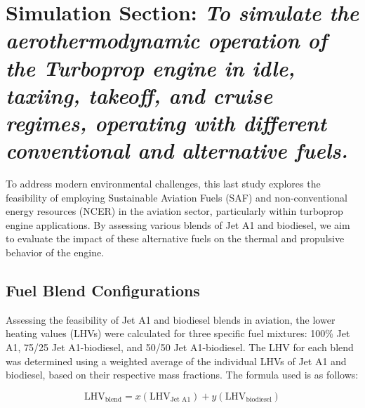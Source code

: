 \documentclass{Format}
\begin{document}


\section{Simulation Section: \emph{To simulate the aerothermodynamic operation of the Turboprop engine in idle, taxiing, takeoff, and cruise regimes, operating with different conventional and alternative fuels.}}\label{sec:Method}

To address modern environmental challenges, this last study explores the feasibility of employing Sustainable Aviation Fuels (SAF) and non-conventional energy resources (NCER) in the aviation sector, particularly within turboprop engine applications. By assessing various blends of Jet A1 and biodiesel, we aim to evaluate the impact of these alternative fuels on the thermal and propulsive behavior of the engine.

\subsection{Fuel Blend Configurations}
Assessing the feasibility of Jet A1 and biodiesel blends in aviation, the lower heating values (LHVs) were calculated for three specific fuel mixtures: 100\% Jet A1, 75/25 Jet A1-biodiesel, and 50/50 Jet A1-biodiesel. The LHV for each blend was determined using a weighted average of the individual LHVs of Jet A1 and biodiesel, based on their respective mass fractions. The formula used is as follows:

\begin{equation}
    \text{LHV}_{\text{blend}} = x ( \text{LHV}_{\text{Jet A1}}) + y ( \text{LHV}_{\text{biodiesel}})
\end{equation}
\end{document}

